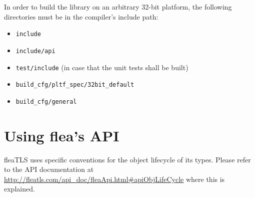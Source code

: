 \documentclass[a4paper,11pt]{scrartcl}
\begin{document}
  In order to build the library on an arbitrary 32-bit platform, the following
  directories must be in the compiler's include path:
  \begin{itemize}
    \item \verb#include#
    \item \verb#include/api#
    \item \verb#test/include# (in case that the unit tests shall be built)
    \item \verb#build_cfg/pltf_spec/32bit_default#
    \item \verb#build_cfg/general#
  \end{itemize}

\section{Using flea's API}

fleaTLS uses specific conventions for the object lifecycle of its types. Please
refer to the API documentation at
\url{http://fleatls.com/api_doc/fleaApi.html#apiObjLifeCycle} where this is
explained.
\end{document}
